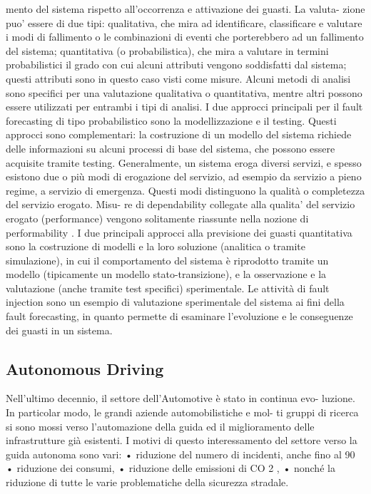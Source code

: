 \documentclass[14pt]{extarticle}
\begin{document}
mento del sistema rispetto all’occorrenza e attivazione dei guasti. La valuta-
zione puo’ essere di due tipi: qualitativa, che mira ad identificare, classificare
e valutare i modi di fallimento o le combinazioni di eventi che porterebbero ad
un fallimento del sistema; quantitativa (o probabilistica), che mira a valutare
in termini probabilistici il grado con cui alcuni attributi vengono soddisfatti
dal sistema; questi attributi sono in questo caso visti come misure. Alcuni
metodi di analisi sono specifici per una valutazione qualitativa o quantitativa, mentre altri possono essere utilizzati per entrambi i tipi di analisi. I due approcci principali per il fault forecasting di tipo probabilistico sono la modellizzazione e il testing. Questi approcci sono complementari: la costruzione di
un modello del sistema richiede delle informazioni su alcuni processi di base
del sistema, che possono essere acquisite tramite testing. Generalmente, un
sistema eroga diversi servizi, e spesso esistono due o più modi di erogazione
del servizio, ad esempio da servizio a pieno regime, a servizio di emergenza.
Questi modi distinguono la qualità o completezza del servizio erogato. Misu-
re di dependability collegate alla qualita’ del servizio erogato (performance)
vengono solitamente riassunte nella nozione di performability \cite{smith1988performability}.
I due principali approcci alla previsione dei guasti quantitativa sono la
costruzione di modelli e la loro soluzione (analitica o tramite simulazione), in
cui il comportamento del sistema è riprodotto tramite un modello (tipicamente
un modello stato-transizione), e la osservazione e la valutazione (anche tramite
test specifici) sperimentale. Le attività di fault injection sono un esempio di
valutazione sperimentale del sistema ai fini della fault forecasting, in quanto
permette di esaminare l’evoluzione e le conseguenze dei guasti in un sistema.



\subsection{Autonomous Driving}
Nell’ultimo decennio, il settore dell’Automotive è stato in continua evo-
luzione. In particolar modo, le grandi aziende automobilistiche e mol-
ti gruppi di ricerca si sono mossi verso l’automazione della guida ed
il miglioramento delle infrastrutture già esistenti. I motivi di questo
interessamento del settore verso la guida autonoma sono vari:
• riduzione del numero di incidenti, anche fino al 90%
• riduzione dei consumi,
• riduzione delle emissioni di CO 2 ,
• nonché la riduzione di tutte le varie problematiche della sicurezza
stradale.
\end{document}
